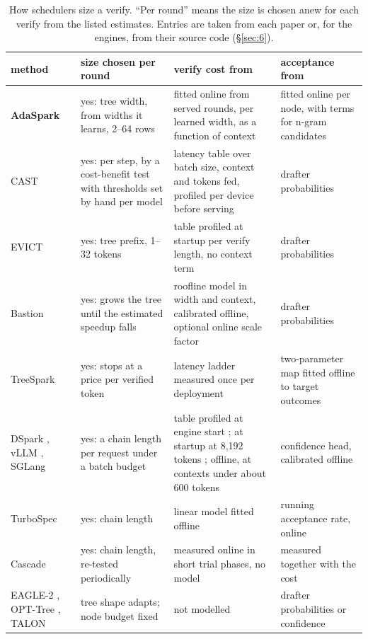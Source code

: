 \documentclass[10pt,twocolumn,letterpaper]{article}
\begin{document}
\begin{table}[t]
\centering\small
\caption{How schedulers size a verify. ``Per round'' means the size is chosen anew for each verify from the listed estimates. Entries are taken from each paper or, for the engines, from their source code (\S\ref{sec:6}).}
\label{tab:sizing}
\setlength{\tabcolsep}{4pt}
\begin{tabularx}{\textwidth}{lXXX}
\toprule
\rowcolor{head}\textbf{method} & \textbf{size chosen per round} & \textbf{verify cost from} & \textbf{acceptance from} \\
\midrule
\textbf{AdaSpark} & yes: tree width, from widths it learns, 2--64 rows & fitted online from served rounds, per learned width, as a function of context & fitted online per node, with terms for n-gram candidates \\
CAST \cite{hong2026inference} & yes: per step, by a cost-benefit test with thresholds set by hand per model & latency table over batch size, context and tokens fed, profiled per device before serving & drafter probabilities \\
EVICT \cite{pan2026making} & yes: tree prefix, 1--32 tokens & table profiled at startup per verify length, no context term & drafter probabilities \\
Bastion \cite{oh2026bastion} & yes: grows the tree until the estimated speedup falls & roofline model in width and context, calibrated offline, optional online scale factor & drafter probabilities \\
TreeSpark \cite{zhou2026treespark} & yes: stops at a price per verified token & latency ladder measured once per deployment & two-parameter map fitted offline to target outcomes \\
DSpark \cite{cheng2026dspark}, vLLM \cite{kwon2023efficient}, SGLang \cite{zheng2024sglang} & yes: a chain length per request under a batch budget & table profiled at engine start \cite{cheng2026dspark}; at startup at 8,192 tokens \cite{kwon2023efficient}; offline, at contexts under about 600 tokens \cite{zheng2024sglang} & confidence head, calibrated offline \cite{cheng2026dspark} \\
TurboSpec \cite{liu2024turbospec} & yes: chain length & linear model fitted offline & running acceptance rate, online \\
Cascade \cite{saxena2025utility} & yes: chain length, re-tested periodically & measured online in short trial phases, no model & measured together with the cost \\
EAGLE-2 \cite{li2024eagleb}, OPT-Tree \cite{wang2025opt}, TALON \cite{liu2026talon} & tree shape adapts; node budget fixed & not modelled & drafter probabilities or confidence \\

\end{tabularx}
\end{table}
\end{document}
